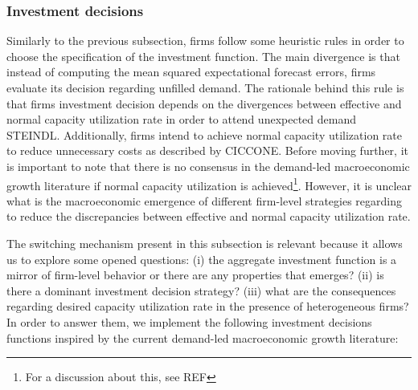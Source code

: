 \documentclass{SelfArx}
\begin{document}
\subsubsection{Investment decisions}
\label{sec:switching_invest}
Similarly to the previous subsection, firms follow some heuristic rules in order to choose the specification of the investment function.
The main divergence is that instead of computing the mean squared expectational forecast errors, firms evaluate its decision regarding unfilled demand.
The rationale behind this rule is that firms investment decision depends on the divergences between effective and normal capacity utilization rate in order to attend unexpected demand STEINDL.
Additionally, firms intend to achieve normal capacity utilization rate to reduce unnecessary costs as described by CICCONE.
Before moving further, it is important to note that there is no consensus in the demand-led macroeconomic growth literature if normal capacity utilization is achieved\footnote{For a discussion about this, see REF}.
However, it is unclear what is the macroeconomic emergence of different firm-level strategies regarding to reduce the discrepancies between effective and normal capacity utilization rate.

The switching mechanism present in this subsection is relevant because it allows us to explore some opened questions:
    (i) the aggregate investment function is a mirror of firm-level behavior or there are any properties that emerges?
    (ii) is there a dominant investment decision strategy?
    (iii) what are the consequences regarding desired capacity utilization rate in the presence of heterogeneous firms?
In order to answer them, we implement the following investment decisions functions inspired by the current demand-led macroeconomic growth literature:
\end{document}
